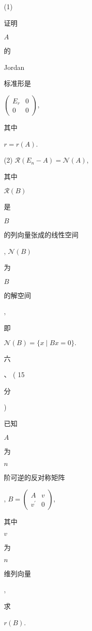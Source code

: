 \documentclass[10pt]{article}
\begin{document}
(1) \begin{CJK}{UTF8}{mj}证明\end{CJK} $A$ \begin{CJK}{UTF8}{mj}的\end{CJK} Jordan \begin{CJK}{UTF8}{mj}标准形是\end{CJK} $\left(\begin{array}{cc}E_{r} & 0 \\ 0 & 0\end{array}\right)$, \begin{CJK}{UTF8}{mj}其中\end{CJK} $r=r(A)$.

(2) $\mathcal{R}\left(E_{n}-A\right)=\mathcal{N}(A)$, \begin{CJK}{UTF8}{mj}其中\end{CJK} $\mathcal{R}(B)$ \begin{CJK}{UTF8}{mj}是\end{CJK} $B$ \begin{CJK}{UTF8}{mj}的列向量张成的线性空间\end{CJK}, $\mathcal{N}(B)$ \begin{CJK}{UTF8}{mj}为\end{CJK} $B$ \begin{CJK}{UTF8}{mj}的解空间\end{CJK}, \begin{CJK}{UTF8}{mj}即\end{CJK} $\mathcal{N}(B)=\{x \mid B x=0\} .$

\begin{CJK}{UTF8}{mj}六\end{CJK}、 ( 15 \begin{CJK}{UTF8}{mj}分\end{CJK}) \begin{CJK}{UTF8}{mj}已知\end{CJK} $A$ \begin{CJK}{UTF8}{mj}为\end{CJK} $n$ \begin{CJK}{UTF8}{mj}阶可逆的反对称矩阵\end{CJK}, $B=\left(\begin{array}{cc}A & v \\ v^{\prime} & 0\end{array}\right)$, \begin{CJK}{UTF8}{mj}其中\end{CJK} $v$ \begin{CJK}{UTF8}{mj}为\end{CJK} $n$ \begin{CJK}{UTF8}{mj}维列向量\end{CJK}, \begin{CJK}{UTF8}{mj}求\end{CJK} $r(B)$.
\end{document}
